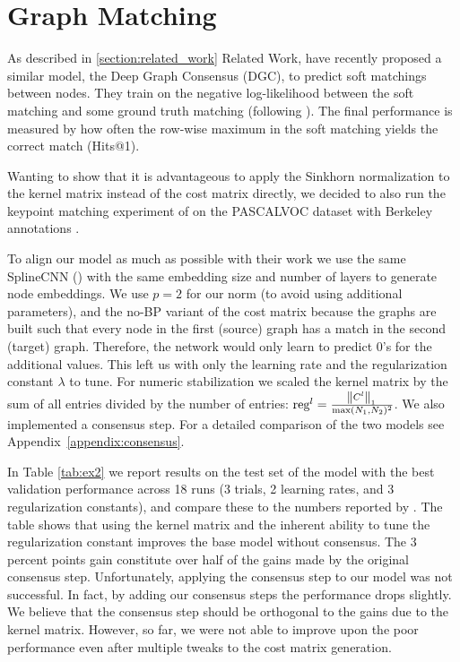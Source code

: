 \section{Graph Matching}

As described in \ref{section:related_work} Related Work, \cite{fey2020_update} have recently proposed a similar model, the Deep Graph Consensus (DGC), to predict soft matchings between nodes. They train on the negative log-likelihood between the soft matching and some ground truth matching (following \citealp{wang2019}). The final performance is measured by how often the row-wise maximum in the soft matching yields the correct match (Hits@1).

Wanting to show that it is advantageous to apply the Sinkhorn normalization to the kernel matrix instead of the cost matrix directly, we decided to also run the keypoint matching experiment of \cite{fey2020_update} on the PASCALVOC  dataset \cite{pascal2010} with Berkeley annotations \cite{annotations2009}.

To align our model as much as possible with their work we use the same SplineCNN (\citealp{spline2018}) with the same embedding size and number of layers to generate node embeddings. We use $p=2$ for our norm (to avoid using additional parameters), and the no-BP variant of the cost matrix because the graphs are built such that every node in the first (source) graph has a match in the second (target) graph. Therefore, the network would only learn to predict 0’s for the additional values. This left us with only the learning rate and the regularization constant $\lambda$ to tune. For numeric stabilization we scaled the kernel matrix by the sum of all entries divided by the number of entries: $\text{reg}^l = \frac{\norm{C^l}_1}{\max(N_1,N_2)^2}$. We also implemented a consensus step. For a detailed comparison of the two models see \mbox{Appendix \ref{appendix:consensus}}.

In Table \ref{tab:ex2} we report results on the test set of the model with the best validation performance across 18 runs (3 trials, 2 learning rates, and 3 regularization constants), and compare these to the numbers reported by \cite{fey2020_update}. The table shows that using the kernel matrix and the inherent ability to tune the regularization constant improves the base model without consensus. The 3 percent points gain constitute over half of the gains made by the original consensus step. Unfortunately, applying the consensus step to our model was not successful. In fact, by adding our consensus steps the performance drops slightly. We believe that the consensus step should be orthogonal to the gains due to the kernel matrix. However, so far, we were not able to improve upon the poor performance even after multiple tweaks to the cost matrix generation.

